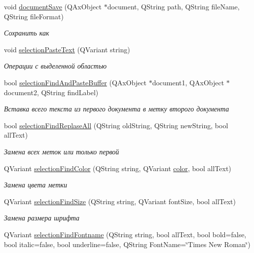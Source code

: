 \begin{DoxyCompactItemize}
void \hyperlink{class_active_word_a7110826e86e73e9fcf43cb01911bc206}{document\+Save} (Q\+Ax\+Object $\ast$document, Q\+String path, Q\+String file\+Name, Q\+String file\+Format)
\begin{DoxyCompactList}\small\item\em Сохранить как \end{DoxyCompactList}\item 
void \hyperlink{class_active_word_a2369abb7672dba291c9542a971f6b437}{selection\+Paste\+Text} (Q\+Variant string)
\begin{DoxyCompactList}\small\item\em Операции с выделенной областью \end{DoxyCompactList}\item 
bool \hyperlink{class_active_word_adee30d193b3278f864cc7c71c66db792}{selection\+Find\+And\+Paste\+Buffer} (Q\+Ax\+Object $\ast$document1, Q\+Ax\+Object $\ast$document2, Q\+String find\+Label)
\begin{DoxyCompactList}\small\item\em Вставка всего текста из первого документа в метку второго документа \end{DoxyCompactList}\item 
bool \hyperlink{class_active_word_ab4b6675d0e538b18d04f419283bd5164}{selection\+Find\+Replase\+All} (Q\+String old\+String, Q\+String new\+String, bool all\+Text)
\begin{DoxyCompactList}\small\item\em Замена всех меток или только первой \end{DoxyCompactList}\item 
Q\+Variant \hyperlink{class_active_word_a8b48d7c2a58e5cf32f5fef13c9ee87ea}{selection\+Find\+Color} (Q\+String string, Q\+Variant \hyperlink{class_active_word_a8d6e8aa40990a0f496a31c419e0849f8}{color}, bool all\+Text)
\begin{DoxyCompactList}\small\item\em Замена цвета метки \end{DoxyCompactList}\item 
Q\+Variant \hyperlink{class_active_word_a9a438b023c04f05101a2686beb2f5585}{selection\+Find\+Size} (Q\+String string, Q\+Variant font\+Size, bool all\+Text)
\begin{DoxyCompactList}\small\item\em Замена размера шрифта \end{DoxyCompactList}\item 
Q\+Variant \hyperlink{class_active_word_a2426ad4ed6fad216c3d2fe8671f0fc4b}{selection\+Find\+Fontname} (Q\+String string, bool all\+Text, bool bold=false, bool italic=false, bool underline=false, Q\+String Font\+Name=\char`\"{}Times New Roman\char`\"{})

\end{DoxyCompactItemize}

